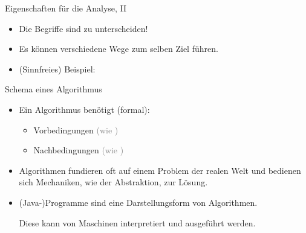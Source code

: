 \begin{frame}{Eigenschaften für die Analyse, II}
    \bigskip
    \begin{itemize}
        \item<6-> Die Begriffe sind zu unterscheiden!
        \item<7-> Es können verschiedene Wege zum selben Ziel führen.
        \item<8-> (Sinnfreies) Beispiel: \smallskip\par
    \end{itemize}
\end{frame}


\begin{frame}{Schema eines Algorithmus}
    \pause\begin{center}
    \end{center}
    \begin{itemize}[<+(1)->]
        \widei
        \item Ein Algorithmus benötigt (formal): \begin{itemize}
            \item Vorbedingungen \textcolor{gray}{(wie )}
            \item Nachbedingungen \textcolor{gray}{(wie )}
        \end{itemize}
        \item Algorithmen fundieren oft auf einem Problem der realen Welt und bedienen sich Mechaniken, wie der Abstraktion, zur Lösung.
        \item (Java-)Programme sind eine Darstellungsform von Algorithmen.\par\pause{}
              Diese kann von Maschinen interpretiert und ausgeführt werden.
     \end{itemize}
\end{frame}

